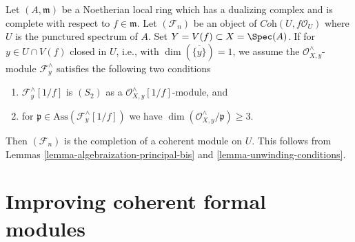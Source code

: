 \begin{remark}
\label{remark-interesting-case-bis}
Let $(A, \mathfrak m)$ be a Noetherian local ring which has a
dualizing complex and is complete with respect to $f \in \mathfrak m$.
Let $(\mathcal{F}_n)$ be an object of $\textit{Coh}(U, f\mathcal{O}_U)$
where $U$ is the punctured spectrum of $A$.
Set $Y = V(f) \subset X = \Spec(A)$.
If for $y \in U \cap V(f)$ closed in $U$, i.e., with
$\dim(\overline{\{y\}}) = 1$, we assume the
$\mathcal{O}_{X, y}^\wedge$-module $\mathcal{F}_y^\wedge$
satisfies the following two conditions
\begin{enumerate}
\item $\mathcal{F}_y^\wedge[1/f]$ is $(S_2)$ as a
$\mathcal{O}_{X, y}^\wedge[1/f]$-module, and
\item for $\mathfrak p \in \text{Ass}(\mathcal{F}_y^\wedge[1/f])$
we have $\dim(\mathcal{O}_{X, y}^\wedge/\mathfrak p) \geq 3$.
\end{enumerate}
Then $(\mathcal{F}_n)$ is the completion of a coherent module on $U$.
This follows from Lemmas \ref{lemma-algebraization-principal-bis}
and \ref{lemma-unwinding-conditions}.
\end{remark}
































\section{Improving coherent formal modules}
\label{section-improving-formal-modules}

